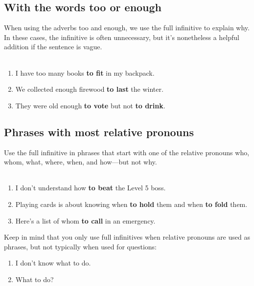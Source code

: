 \subsection{With the words too or enough}
When using the adverbs too and enough, we use the full infinitive to explain why. 
In these cases, the infinitive is often unnecessary, 
but it’s nonetheless a helpful addition if the sentence is vague. \\\\
\begin{enumerate}
    \item[] I have too many books \textbf{to fit} in my backpack. 
    \item[] We collected enough firewood \textbf{to last} the winter. 
    \item[] They were old enough \textbf{to vote} but not \textbf{to drink}. 
\end{enumerate}




\subsection{Phrases with most relative pronouns}
Use the full infinitive in phrases that start with one of the relative pronouns 
who, whom, what, where, when, and how—but not why.\\\\ 
\begin{enumerate}
    \item[] I don’t understand how \textbf{to beat} the Level 5 boss. 
    \item[] Playing cards is about knowing when \textbf{to hold} them and when \textbf{to fold} them. 
    \item[] Here’s a list of whom \textbf{to call} in an emergency. 
\end{enumerate}
Keep in mind that you only use full infinitives when relative pronouns are used as phrases, 
but not typically when used for questions:
\begin{enumerate}
    \item[] I don’t know what to do.
    \item[] What to do?
\end{enumerate}



